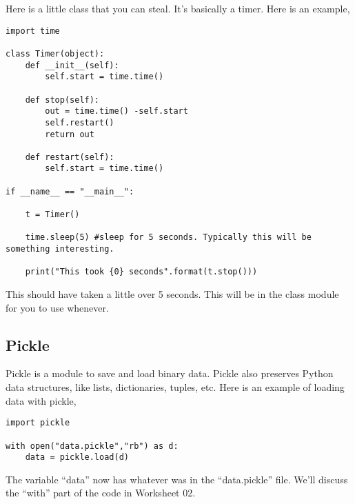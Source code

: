 \documentclass[11pt,letterpaper]{article}
\begin{document}
Here is a little class that you can steal. It's basically a timer. Here is an example,
\begin{verbatim}
import time

class Timer(object):
    def __init__(self):
        self.start = time.time()
        
    def stop(self):
        out = time.time() -self.start
        self.restart()
        return out
    
    def restart(self):
        self.start = time.time()

if __name__ == "__main__":
    
    t = Timer()

    time.sleep(5) #sleep for 5 seconds. Typically this will be something interesting.

    print("This took {0} seconds".format(t.stop()))
\end{verbatim}
This should have taken a little over 5 seconds. This will be in the class module for you to use whenever.


\subsection{Pickle}
Pickle is a module to save and load binary data. Pickle also preserves Python data structures, like lists, dictionaries, tuples, etc. Here is an example of loading data with pickle,
\begin{verbatim}
import pickle

with open("data.pickle","rb") as d:
    data = pickle.load(d)
\end{verbatim}
The variable ``data'' now has whatever was in the ``data.pickle'' file. We'll discuss the ``with'' part of the code in Worksheet 02. 
\end{document}
